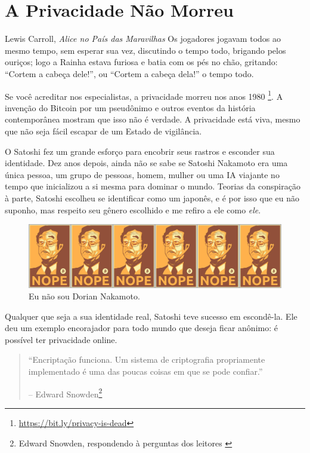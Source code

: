 \chapter{A Privacidade Não Morreu}
\label{les:19}

\begin{chapquote}{Lewis Carroll, \textit{Alice no País das Maravilhas}}
	Os jogadores jogavam todos ao mesmo tempo, sem esperar sua vez, discutindo o tempo todo, brigando pelos ouriços; logo a Rainha estava furiosa e batia com os pés no chão, gritando: \enquote{Cortem a cabeça dele!}, ou \enquote{Cortem a cabeça dela!} o tempo todo.
\end{chapquote}

Se você acreditar nos especialistas, a privacidade morreu nos anos 1980
\footnote{\url{https://bit.ly/privacy-is-dead}}. A invenção do Bitcoin por um 
pseudônimo e outros eventos da história contemporânea mostram que isso não é verdade.
A privacidade está viva, mesmo que não seja fácil escapar de um Estado de vigilância. 

O Satoshi fez um grande esforço para encobrir seus rastros e esconder sua identidade. Dez anos depois, ainda não se sabe se Satoshi Nakamoto era uma única pessoa, um grupo de pessoas, homem, mulher ou uma IA viajante no tempo que inicializou a si mesma para dominar o mundo. Teorias da conspiração à parte, Satoshi escolheu se identificar como um japonês, e é por isso que eu não suponho, mas respeito seu gênero escolhido e me refiro a ele como \textit{ele}. 

\begin{figure}
  \includegraphics{assets/images/nope.png}
  \caption{Eu não sou Dorian Nakamoto.}
  \label{fig:nope}
\end{figure}

Qualquer que seja a sua identidade real, Satoshi teve sucesso em escondê-la. 
Ele deu um exemplo encorajador para todo mundo que deseja ficar anônimo: 
é possível ter privacidade online.

\begin{quotation}\begin{samepage}
\enquote{Encriptação funciona. Um sistema de criptografia propriamente implementado é uma das poucas coisas em que se pode confiar.}
\begin{flushright} -- Edward Snowden\footnote{Edward Snowden, respondendo à perguntas dos leitores \cite{snowden}}
\end{flushright}\end{samepage}\end{quotation}


